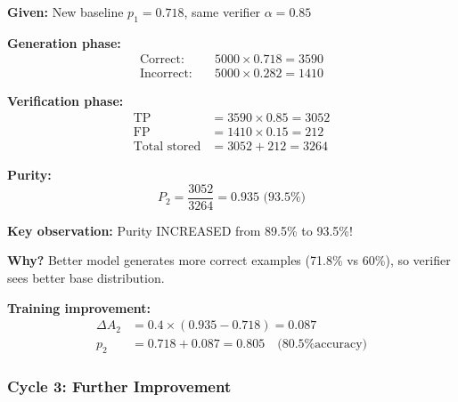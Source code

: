 \documentclass[12pt,a4paper]{article}
\theoremstyle{definition}
\begin{document}
\begin{examplebox}[title=Cycle 2 Detailed Calculation]

\textbf{Given:} New baseline $p_1 = 0.718$, same verifier $\alpha = 0.85$

\textbf{Generation phase:}
\begin{align}
\text{Correct:} \quad & 5000 \times 0.718 = 3590 \\
\text{Incorrect:} \quad & 5000 \times 0.282 = 1410
\end{align}

\textbf{Verification phase:}
\begin{align}
\text{TP} &= 3590 \times 0.85 = 3052 \\
\text{FP} &= 1410 \times 0.15 = 212 \\
\text{Total stored} &= 3052 + 212 = 3264
\end{align}

\textbf{Purity:}
\begin{equation}
P_2 = \frac{3052}{3264} = 0.935 \text{ (93.5\%)}
\end{equation}

\textbf{Key observation:} Purity INCREASED from 89.5\% to 93.5\%!

\textbf{Why?} Better model generates more correct examples (71.8\% vs 60\%), so verifier sees better base distribution.

\textbf{Training improvement:}
\begin{align}
\Delta A_2 &= 0.4 \times (0.935 - 0.718) = 0.087 \\
p_2 &= 0.718 + 0.087 = 0.805 \quad \text{(80.5\% accuracy)}
\end{align}
\end{examplebox}

\subsubsection{Cycle 3: Further Improvement}
\end{document}
